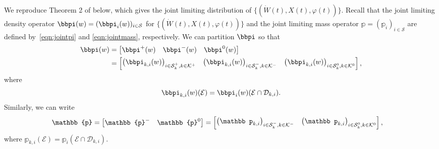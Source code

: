We reproduce Theorem 2 of \cite{bo2014} below, which gives the joint limiting distribution of $\{(\dot W(t),X(t),  \varphi(t))\}$. Recall that the joint limiting density operator ${\bbpi}(w) = (\bbpi_i(w))_{i \in \mathcal{S}}$ for $\{(\dot W(t), X(t), \varphi(t))\}$ and the joint limiting mass operator ${\mathbb p} = (\mathbb p_i)_{i \in \mathcal{S}}$ are defined by~\eqref{eqn:jointpi} and \eqref{eqn:jointmass}, respectively. %
We can partition \(\bbpi\) so that 
% 
	\begin{align*} 
		\bbpi(w) &= \vligne{\bbpi^{+}(w) & \bbpi^{-}(w) & \bbpi^{0}(w)} 
		\\&= \vligne{\left(\bbpi_{k,i}(w)\right)_{i \in \mathcal{S}_k^+,k\in\mathcal K^+} & \left(\bbpi_{k,i}(w)\right)_{i \in \mathcal{S}_k^-,k\in\mathcal K^-} & \left(\bbpi_{k,i}(w)\right)_{i \in \mathcal{S}_k^0,k\in\mathcal K^0}},
	\end{align*} 
	where  
% 
	\begin{align*} 
		\bbpi_{k,i}(w)(\mathcal{E}) = \bbpi_i(w)(\mathcal{E}\cap \mathcal D_{k,i}).
	\end{align*} 
%
Similarly, we can write 
	\begin{align*} 
		\mathbb{p} &= \vligne{\mathbb{p}^{-} & \mathbb{p}^{0}} 
		= \vligne{\left(\mathbb p_{k,i}\right)_{i \in \mathcal{S}_k^-,k\in\mathcal K^-}  & \left(\mathbb p_{k,i}\right)_{i \in \mathcal{S}_k^0,k\in\mathcal K^0} },
	\end{align*} 
	where  
% 
	\( 
		\mathbb p_{k,i}(\mathcal{E}) = \mathbb p_i(\mathcal{E}\cap \mathcal D_{k,i}).
	\) 
%
